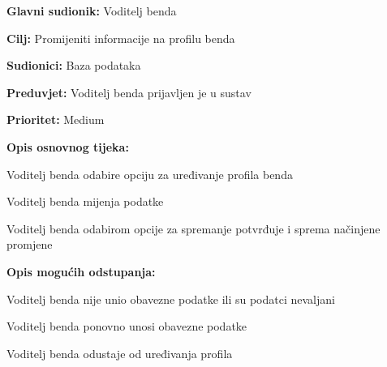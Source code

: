 \noindent {}
	\begin{packed_item}
		
		\item \textbf{Glavni sudionik:} Voditelj benda
		\item \textbf{Cilj:} Promijeniti informacije na profilu benda
		\item \textbf{Sudionici:} Baza podataka
		\item \textbf{Preduvjet:} Voditelj benda prijavljen je u sustav
		\item \textbf{Prioritet:} Medium
		\item \textbf{Opis osnovnog tijeka:} 
		
		\item[] \begin{packed_enum}
			
			\item Voditelj benda odabire opciju za uređivanje profila benda
			\item Voditelj benda mijenja podatke
			\item Voditelj benda odabirom opcije za spremanje potvrđuje i sprema načinjene promjene
		\end{packed_enum} 
	
		\item  \textbf{Opis mogućih odstupanja:}
		\item[] \begin{packed_item}
			
			\item[3.a] Voditelj benda nije unio obavezne podatke ili su podatci nevaljani
			\item[] \begin{packed_enum}
				\item Voditelj benda ponovno unosi obavezne podatke
				\item Voditelj benda odustaje od uređivanja profila
			\end{packed_enum}	
			
		\end{packed_item} 
	
	\end{packed_item}

